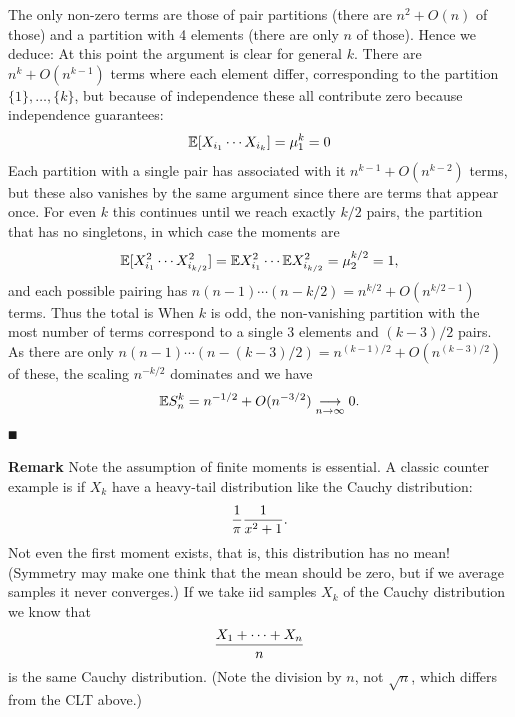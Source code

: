 The only non-zero terms are those of pair partitions (there are $n^2 + O(n)$ of those) and a partition with 4 elements (there are only $n$ of those). Hence we deduce:
At this point the argument is clear for general $k$. There are $n^k + O(n^{k-1})$ terms where each element differ, corresponding to the partition $\{1\},\ensuremath{\ldots},\{k\}$, but because of independence these all contribute zero because independence guarantees:
\[
{\mathbb E}[X_{i_1} \cdots X_{i_k}] = \mu_1^k = 0
\]
Each partition with a single pair has associated with it $n^{k-1} + O(n^{k-2})$ terms, but these also vanishes by the same argument since there are terms that appear once. For even $k$ this continues until we reach exactly $k/2$ pairs, the partition that has no singletons, in which case the moments are
\[
{\mathbb E}[X_{i_1}^2 \cdots X_{i_{k/2}}^2] = {\mathbb E} X_{i_1}^2 \cdots {\mathbb E} X_{i_{k/2}}^2 = \mu_2^{k/2} = 1,
\]
and each possible pairing has $n (n-1) \ensuremath{\cdots} (n-k/2) = n^{k/2} + O(n^{k/2-1})$ terms. Thus the total is
When $k$ is odd, the non-vanishing partition with the most number of terms correspond to a single 3 elements and $(k-3)/2$ pairs. As there are only $n (n-1) \ensuremath{\cdots} (n-(k-3)/2) = n^{(k-1)/2} + O(n^{(k-3)/2})$ of these, the scaling $n^{-k/2}$ dominates and we have
\[
{\mathbb E} S_n^k = n^{-1/2} + O(n^{-3/2}) \underset{n \rightarrow \infty}{\longrightarrow} 0.
\]
\ensuremath{\QED}

\textbf{Remark} Note the assumption of finite moments is essential. A classic counter example is if $X_k$ have a heavy-tail distribution like the Cauchy distribution:
\[
{1 \over \ensuremath{\pi}} {1 \over x^2 + 1}.
\]
Not even the first moment exists, that is, this distribution has no mean! (Symmetry may make one think that the mean should be zero, but if we average samples it never converges.) If we take iid samples $X_k$ of the Cauchy distribution we know that
\[
{X_1 + \ensuremath{\cdots} + X_n \over n}
\]
is the same Cauchy distribution. (Note the division by $n$, not $\sqrt{n}$, which differs from the CLT above.)

